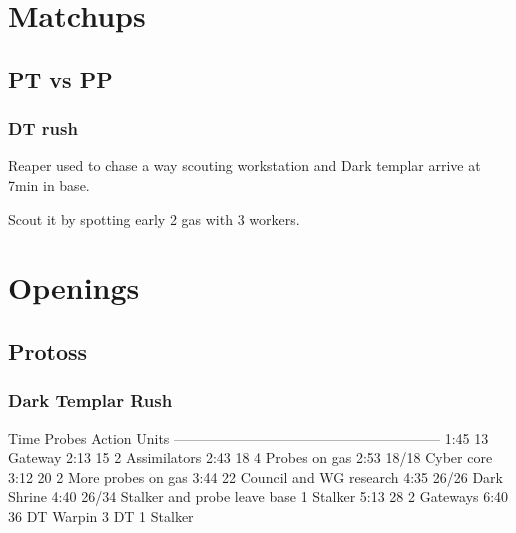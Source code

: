 \documentclass{article}
\begin{document}
\section{Matchups}
\subsection{PT vs PP}
\subsubsection{DT rush}
Reaper used to chase a way scouting workstation and Dark
templar arrive at 7min in base.

Scout it by spotting early 2 gas with 3 workers.


\section{Openings}
\subsection{Protoss}
\subsubsection{Dark Templar Rush}

Time	Probes	Action				Units
---------------------------------------------------------
 1:45	13	Gateway
 2:13	15	2 Assimilators
 2:43	18	4 Probes on gas
 2:53	18/18	Cyber core
 3:12	20	2 More probes on gas
 3:44	22	Council and WG research
 4:35	26/26	Dark Shrine
 4:40	26/34	Stalker and probe leave base	1 Stalker
 5:13	28	2 Gateways
 6:40	36	DT Warpin			3 DT 1 Stalker
\end{document}
